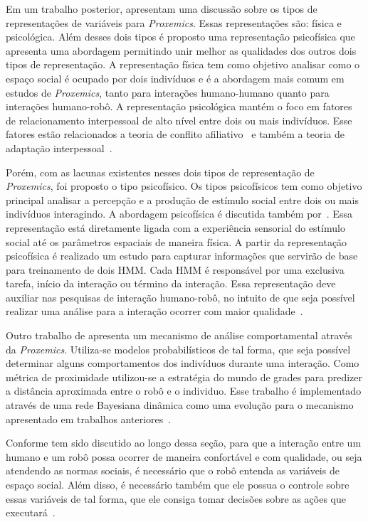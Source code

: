 Em um trabalho posterior,  apresentam uma discussão sobre os tipos de representações de variáveis para \emph{Proxemics}. Essas representações são: física e psicológica. Além desses dois tipos é proposto uma representação psicofísica que apresenta uma abordagem permitindo unir melhor as qualidades dos outros dois tipos de representação. A representação física tem como objetivo analisar como o espaço social é ocupado por dois indivíduos e é a abordagem mais comum em estudos de \emph{Proxemics}, tanto para interações humano-humano quanto para interações humano-robô. A representação psicológica mantém o foco em fatores de relacionamento interpessoal de alto nível entre dois ou mais indivíduos. Esse fatores estão relacionados a teoria de conflito afiliativo~\cite{Argyle:1965} e também a teoria de adaptação interpessoal~\cite{Burgoon:2007}.

Porém, com as lacunas existentes nesses dois tipos de representação de \emph{Proxemics}, foi proposto o tipo psicofísico. Os tipos psicofísicos tem como objetivo principal analisar a percepção e a produção de estímulo social entre dois ou mais indivíduos interagindo. A abordagem psicofísica é discutida também por~. Essa representação está diretamente ligada com a experiência sensorial do estímulo social até os parâmetros espaciais de maneira física. A partir da representação psicofísica é realizado um estudo para capturar informações que servirão de base para treinamento de dois HMM. Cada HMM é responsável por uma exclusiva tarefa, início da interação ou término da interação. Essa representação deve auxiliar nas pesquisas de interação humano-robô, no intuito de que seja possível realizar uma análise para a interação ocorrer com maior qualidade~\cite{Mead:2012}.

Outro trabalho de  apresenta um mecanismo de análise comportamental através da \emph{Proxemics}. Utiliza-se modelos probabilísticos de tal forma, que seja possível determinar alguns comportamentos dos indivíduos durante uma interação. Como métrica de proximidade utilizou-se a estratégia do mundo de grades para predizer a distância aproximada entre o robô e o individuo. Esse trabalho é implementado através de uma rede Bayesiana dinâmica como uma evolução para o mecanismo apresentado em trabalhos anteriores~\cite{Mead:2012b}.

Conforme tem sido discutido ao longo dessa seção, para que a interação entre um humano e um robô possa ocorrer de maneira confortável e com qualidade, ou seja atendendo as normas sociais, é necessário que o robô entenda as variáveis de espaço social. Além disso, é necessário também que ele possua o controle sobre essas variáveis de tal forma, que ele consiga tomar decisões sobre as ações que executará~\cite{Mead:2013b}.

